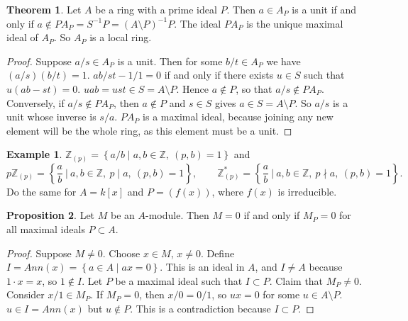 \documentclass{article}
\newcommand{\Z}{\mathbb{Z}}
\newcommand{\rb}[1]{\left( #1 \right)}
\renewcommand{\sb}[1]{\left[ #1 \right]}
\newcommand{\cb}[1]{\left\{ #1 \right\}}
\theoremstyle{definition}\newtheorem{definition}{Definition}[section]
\theoremstyle{definition}\newtheorem{remark}[definition]{Remark}
\theoremstyle{definition}\newtheorem*{example}{Example}
\theoremstyle{definition}\newtheorem*{note}{Note}
\newtheorem{proposition}[definition]{Proposition}
\newtheorem{theorem}[definition]{Theorem}
\begin{document}
\begin{theorem}
Let $ A $ be a ring with a prime ideal $ P $. Then $ a \in A_P $ is a unit if and only if $ a \notin PA_P = S^{-1}P = \rb{A \setminus P}^{-1}P $. The ideal $ PA_P $ is the unique maximal ideal of $ A_P $. So $ A_P $ is a local ring.
\end{theorem}

\begin{proof}
Suppose $ a / s \in A_P $ is a unit. Then for some $ b / t \in A_P $ we have $ \rb{a / s}\rb{b / t} = 1 $. $ ab / st - 1 / 1 = 0 $ if and only if there exists $ u \in S $ such that $ u\rb{ab - st} = 0 $. $ uab = ust \in S = A \setminus P $. Hence $ a \notin P $, so that $ a / s \notin PA_P $. Conversely, if $ a / s \notin PA_P $, then $ a \notin P $ and $ s \in S $ gives $ a \in S = A \setminus P $. So $ a / s $ is a unit whose inverse is $ s / a $. $ PA_P $ is a maximal ideal, because joining any new element will be the whole ring, as this element must be a unit.
\end{proof}

\begin{example}
$ \Z_{\rb{p}} = \cb{a / b \mid a, b \in \Z, \ \rb{p, b} = 1} $ and
$$ p\Z_{\rb{p}} = \cb{\dfrac{a}{b} \ \Bigg| \ a, b \in \Z, \ p \mid a, \ \rb{p, b} = 1}, \qquad \Z_{\rb{p}}^* = \cb{\dfrac{a}{b} \ \Bigg| \ a, b \in \Z, \ p \nmid a, \ \rb{p, b} = 1}. $$
Do the same for $ A = k\sb{x} $ and $ P = \rb{f\rb{x}} $, where $ f\rb{x} $ is irreducible.
\end{example}

\begin{proposition}
Let $ M $ be an $ A $-module. Then $ M = 0 $ if and only if $ M_P = 0 $ for all maximal ideals $ P \subset A $.
\end{proposition}

\begin{proof}
Suppose $ M \ne 0 $. Choose $ x \in M $, $ x \ne 0 $. Define $ I = Ann\rb{x} = \cb{a \in A \mid ax = 0} $. This is an ideal in $ A $, and $ I \ne A $ because $ 1 \cdot x = x $, so $ 1 \notin I $. Let $ P $ be a maximal ideal such that $ I \subset P $. Claim that $ M_P \ne 0 $. Consider $ x / 1 \in M_P $. If $ M_P = 0 $, then $ x / 0 = 0 / 1 $, so $ ux = 0 $ for some $ u \in A \setminus P $. $ u \in I = Ann\rb{x} $ but $ u \notin P $. This is a contradiction because $ I \subset P $.
\end{proof}

\end{document}

